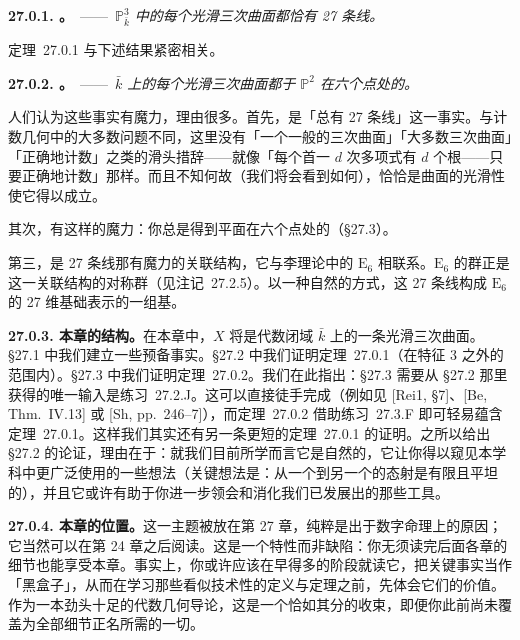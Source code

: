 \textbf{27.0.1. \trhTheorem。}\ ——\ \emph{$\mathbb{P}^3_{\bar{k}}$ 中的每个光滑三次曲面都恰有 27 条线。}

\mbox{定理~27.0.1} 与下述结果紧密相关。

\textbf{27.0.2. \trhTheorem。}\ ——\ \emph{$\bar{k}$ 上的每个光滑三次曲面都\trIsomorphic{}于 $\mathbb{P}^2$ 在六个点处的\trBlowup。}

人们认为这些事实有魔力，理由很多。首先，是「总有 27 条线」这一事实。与计数几何中的大多数问题不同，这里没有「一个一般的三次曲面」「大多数三次曲面」「正确地计数」之类的滑头措辞——就像「每个首一 $d$ 次多项式有 $d$ 个根——只要正确地计数」那样。而且不知何故（我们将会看到如何），恰恰是曲面的光滑性使它得以成立。

其次，有这样的魔力：你总是得到平面在六个点处的\trBlowup（\S27.3）。

第三，是 27 条线那有魔力的关联结构，它与李理论中的 $\mathrm{E}_6$ 相联系。$\mathrm{E}_6$ 的\trWeyl{}群正是这一关联结构的对称群（见\mbox{注记~27.2.5}）。以一种自然的方式，这 27 条线构成 $\mathrm{E}_6$ 的 27 维基础表示的一组基。

\textbf{27.0.3. 本章的结构。}\quad 在本章中，$X$ 将是代数闭域 $\bar{k}$ 上的一条光滑三次曲面。\S27.1 中我们建立一些预备事实。\S27.2 中我们证明\mbox{定理~27.0.1}（在特征 $3$ 之外的范围内）。\S27.3 中我们证明\mbox{定理~27.0.2}。我们在此指出：\S27.3 需要从 \S27.2 那里获得的唯一输入是\mbox{练习~27.2.J}。这可以直接徒手完成（例如见 [Rei1, \S7]、[Be, Thm.~IV.13] 或 [Sh, pp.~246--7]），而\mbox{定理~27.0.2} 借助\mbox{练习~27.3.F} 即可轻易蕴含\mbox{定理~27.0.1}。这样我们其实还有另一条更短的\mbox{定理~27.0.1} 的证明。之所以给出 \S27.2 的论证，理由在于：就我们目前所学而言它是自然的，它让你得以窥见本学科中更广泛使用的一些想法（关键想法是：从一个\trModuliSpace{}到另一个\trModuliSpace{}的态射是有限且平坦的），并且它或许有助于你进一步领会和消化我们已发展出的那些工具。

\textbf{27.0.4. 本章的位置。}\quad 这一主题被放在第 27 章，纯粹是出于数字命理上的原因；它当然可以在第 24 章之后阅读。这是一个特性而非缺陷：你无须读完后面各章的细节也能享受本章。事实上，你或许应该在早得多的阶段就读它，把关键事实当作「黑盒子」，从而在学习那些看似技术性的定义与定理之前，先体会它们的价值。作为一本劲头十足的代数几何导论，这是一个恰如其分的收束，即便你此前尚未覆盖为全部细节正名所需的一切。




